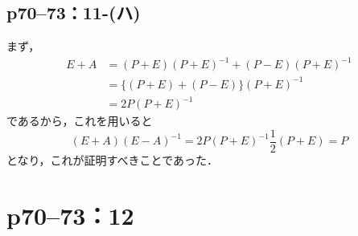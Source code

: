 \subsection*{p70--73：11-(ハ)}

\begin{tproof}
  まず，
  \begin{align*}
    E+A & =(P+E)(P+E)^{-1}+(P-E) (P+E)^{-1} \\
        & = \{ (P+E)+(P-E) \} (P+E)^{-1}    \\
        & = 2P (P+E)^{-1}
  \end{align*}
  であるから，これを用いると
  \[
    (E+A)(E-A)^{-1} = 2P (P+E)^{-1} \frac{1}{2} (P+E) =P
  \]
  となり，これが証明すべきことであった．
\end{tproof}


\section*{p70--73：12}


